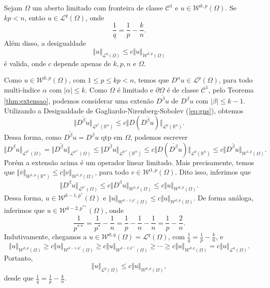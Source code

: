 \documentclass[a4paper, 11pt]{book}
\theoremstyle{definition}
\newcommand{\bR}{\mathbb{R}}
\newcommand{\cC}{\mathcal{C}}
\newcommand{\cL}{\mathcal{L}}
\newcommand{\cW}{\mathcal{W}}
\begin{document}
\begin{tbox} \label{thm:geral-1}
    Sejam $\Omega$ um aberto limitado com fronteira de classe $\cC^1$ e $u \in \cW^{k,p}(\Omega)$.
    Se $kp < n$, então $u \in \cL^q(\Omega)$, onde
    \[
        \frac{1}{q} = \frac{1}{p} - \frac{k}{n}.
    \]
    Além disso, a desigualdade
    \[
        \Vert u \Vert_{\cL^q(\Omega)} \leqslant c \Vert u \Vert_{\cW^{k,p}(\Omega)}
    \]
    é valida, onde $c$ depende apenas de $k, p, n$ e $\Omega$.
\end{tbox}
\begin{prf}
    Como $u \in \cW^{k,p}(\Omega)$, com $1 \leqslant p \leqslant kp < n$, temos que $D^\alpha u \in \cL^p(\Omega)$, para todo multi-índice $\alpha$ com $|\alpha| \leqslant k$. 
    Como $\Omega$ é limitado e $\partial\Omega$ é de classe $\cC^1$, pelo Teorema \ref{thm:extensao}, podemos considerar uma extenão $\overline{D^\beta u}$ de $D^\beta u$ com $|\beta| \leqslant k -1$. 
    Utilizando a Desigualdade de Gagliardo-Nirenberg-Sobolev (\ref{eq:gns}), obtemos
    \[
        \Vert \overline{D^\beta u} \Vert_{\cL^{p^*}(\bR^n)} \leqslant c \Vert D (\overline{D^\beta u}) \Vert_{\cL^p(\bR^ n)}.
    \]
    Dessa forma, como $\overline{D^\beta u} = D^\beta u$ qtp em $\Omega$, podemos escrever
    \[
        \Vert D^\beta u \Vert_{\cL^{p^*}(\Omega)} = \Vert \overline{D^\beta u} \Vert_{\cL^{p*}(\Omega)} \leqslant \Vert \overline{D^\beta u} \Vert_{\cL^{p*}(\bR^n)} \leqslant c \Vert D (\overline{D^\beta}u) \Vert_{\cL^p(\bR^ n)} \leqslant c \Vert \overline{D^\beta u} \Vert_{\cW^{1,p}(\Omega)}.
    \]
    Porém a extensão acima é um operador linear limitado. Mais precisamente, temos que $\Vert \bar v \Vert_{\cW^{1,p}(\bR^n)} \leqslant c \Vert v \Vert_{\cW^{1,p}(\Omega)}$, para todo $v \in \cW^{1,p}(\Omega)$. Dito isso, inferimos que
    \[
        \Vert D^\beta u \Vert_{\cL^{p^*}(\Omega)} \leqslant c \Vert D^\beta u \Vert_{\cW^{1,p}(\Omega)} \leqslant c \Vert u \Vert_{\cW^{k,p}(\Omega)}.
    \]
    Dessa forma, $u \in \cW^{k-1,p^*}(\Omega)$ e $\Vert u \Vert_{\cW^{k-1,p^*}(\Omega)} \leqslant c \Vert u \Vert_{\cW^{k,p}(\Omega)}$.
    De forma análoga, inferimos que $u \in \cW^{k-2,p^{**}}(\Omega)$, onde
    \[
        \frac{1}{p^{**}} = \frac{1}{p^*} - \frac{1}{n} = \frac{1}{p} - \frac{1}{n} - \frac{1}{n} = \frac{1}{p} - \frac{2}{n}.
    \]
    Indutivamente, chegamos a $u \in \cW^{0,q}(\Omega) = \cL^q(\Omega)$, com $\frac{1}{q} = \frac{1}{p} - \frac{k}{n}$, e
    \[
        \Vert u \Vert_{\cW^{k,p}(\Omega)} \geqslant c \Vert u \Vert_{\cW^{k-1,p^*}(\Omega)} \geqslant c \Vert u \Vert_{\cW^{k-2,p^{**}}(\Omega)} \geqslant \cdots\geqslant c \Vert u \Vert_{\cW^{0,q}(\Omega)} = c\Vert u \Vert_{\cL^q(\Omega)}.
    \]
    Portanto,
    \[
        \Vert u \Vert_{\cL^q(\Omega)} \leqslant c \Vert u \Vert_{\cW^{k,p}(\Omega)},
    \]
    desde que $\frac{1}{q} = \frac{1}{p} - \frac{k}{n}$.
\end{prf}
\end{document}
